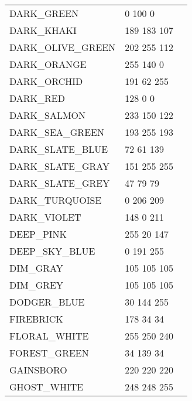 \documentclass{article}
\begin{document}
\begin{longtable}{lll}
DARK\_GREEN & 0 100 0 & \colorbox[RGB]{0 100 0}{\phantom{MMMMMMMM}}\\
DARK\_KHAKI & 189 183 107 & \colorbox[RGB]{189 183 107}{\phantom{MMMMMMMM}}\\
DARK\_OLIVE\_GREEN & 202 255 112 & \colorbox[RGB]{202 255 112}{\phantom{MMMMMMMM}}\\
DARK\_ORANGE & 255 140 0 & \colorbox[RGB]{255 140 0}{\phantom{MMMMMMMM}}\\
DARK\_ORCHID & 191 62 255 & \colorbox[RGB]{191 62 255}{\phantom{MMMMMMMM}}\\
DARK\_RED & 128 0 0 & \colorbox[RGB]{128 0 0}{\phantom{MMMMMMMM}}\\
DARK\_SALMON & 233 150 122 & \colorbox[RGB]{233 150 122}{\phantom{MMMMMMMM}}\\
DARK\_SEA\_GREEN & 193 255 193 & \colorbox[RGB]{193 255 193}{\phantom{MMMMMMMM}}\\
DARK\_SLATE\_BLUE & 72 61 139 & \colorbox[RGB]{72 61 139}{\phantom{MMMMMMMM}}\\
DARK\_SLATE\_GRAY & 151 255 255 & \colorbox[RGB]{151 255 255}{\phantom{MMMMMMMM}}\\
DARK\_SLATE\_GREY & 47 79 79 & \colorbox[RGB]{47 79 79}{\phantom{MMMMMMMM}}\\
DARK\_TURQUOISE & 0 206 209 & \colorbox[RGB]{0 206 209}{\phantom{MMMMMMMM}}\\
DARK\_VIOLET & 148 0 211 & \colorbox[RGB]{148 0 211}{\phantom{MMMMMMMM}}\\
DEEP\_PINK & 255 20 147 & \colorbox[RGB]{255 20 147}{\phantom{MMMMMMMM}}\\
DEEP\_SKY\_BLUE & 0 191 255 & \colorbox[RGB]{0 191 255}{\phantom{MMMMMMMM}}\\
DIM\_GRAY & 105 105 105 & \colorbox[RGB]{105 105 105}{\phantom{MMMMMMMM}}\\
DIM\_GREY & 105 105 105 & \colorbox[RGB]{105 105 105}{\phantom{MMMMMMMM}}\\
DODGER\_BLUE & 30 144 255 & \colorbox[RGB]{30 144 255}{\phantom{MMMMMMMM}}\\
FIREBRICK & 178 34 34 & \colorbox[RGB]{178 34 34}{\phantom{MMMMMMMM}}\\
FLORAL\_WHITE & 255 250 240 & \colorbox[RGB]{255 250 240}{\phantom{MMMMMMMM}}\\
FOREST\_GREEN & 34 139 34 & \colorbox[RGB]{34 139 34}{\phantom{MMMMMMMM}}\\
GAINSBORO & 220 220 220 & \colorbox[RGB]{220 220 220}{\phantom{MMMMMMMM}}\\
GHOST\_WHITE & 248 248 255 & \colorbox[RGB]{248 248 255}{\phantom{MMMMMMMM}}\\

\end{longtable}
\end{document}
